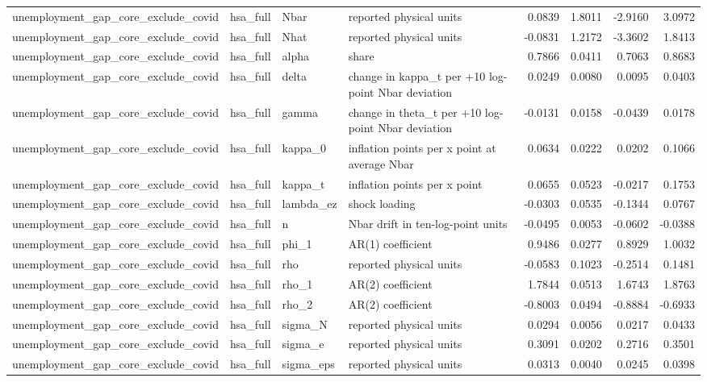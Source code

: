 \begin{tabular}{llllrrrr}
unemployment\_gap\_core\_exclude\_covid & hsa\_full & Nbar & reported physical units & 0.0839 & 1.8011 & -2.9160 & 3.0972 \\
unemployment\_gap\_core\_exclude\_covid & hsa\_full & Nhat & reported physical units & -0.0831 & 1.2172 & -3.3602 & 1.8413 \\
unemployment\_gap\_core\_exclude\_covid & hsa\_full & alpha & share & 0.7866 & 0.0411 & 0.7063 & 0.8683 \\
unemployment\_gap\_core\_exclude\_covid & hsa\_full & delta & change in kappa\_t per +10 log-point Nbar deviation & 0.0249 & 0.0080 & 0.0095 & 0.0403 \\
unemployment\_gap\_core\_exclude\_covid & hsa\_full & gamma & change in theta\_t per +10 log-point Nbar deviation & -0.0131 & 0.0158 & -0.0439 & 0.0178 \\
unemployment\_gap\_core\_exclude\_covid & hsa\_full & kappa\_0 & inflation points per x point at average Nbar & 0.0634 & 0.0222 & 0.0202 & 0.1066 \\
unemployment\_gap\_core\_exclude\_covid & hsa\_full & kappa\_t & inflation points per x point & 0.0655 & 0.0523 & -0.0217 & 0.1753 \\
unemployment\_gap\_core\_exclude\_covid & hsa\_full & lambda\_ez & shock loading & -0.0303 & 0.0535 & -0.1344 & 0.0767 \\
unemployment\_gap\_core\_exclude\_covid & hsa\_full & n & Nbar drift in ten-log-point units & -0.0495 & 0.0053 & -0.0602 & -0.0388 \\
unemployment\_gap\_core\_exclude\_covid & hsa\_full & phi\_1 & AR(1) coefficient & 0.9486 & 0.0277 & 0.8929 & 1.0032 \\
unemployment\_gap\_core\_exclude\_covid & hsa\_full & rho & reported physical units & -0.0583 & 0.1023 & -0.2514 & 0.1481 \\
unemployment\_gap\_core\_exclude\_covid & hsa\_full & rho\_1 & AR(2) coefficient & 1.7844 & 0.0513 & 1.6743 & 1.8763 \\
unemployment\_gap\_core\_exclude\_covid & hsa\_full & rho\_2 & AR(2) coefficient & -0.8003 & 0.0494 & -0.8884 & -0.6933 \\
unemployment\_gap\_core\_exclude\_covid & hsa\_full & sigma\_N & reported physical units & 0.0294 & 0.0056 & 0.0217 & 0.0433 \\
unemployment\_gap\_core\_exclude\_covid & hsa\_full & sigma\_e & reported physical units & 0.3091 & 0.0202 & 0.2716 & 0.3501 \\
unemployment\_gap\_core\_exclude\_covid & hsa\_full & sigma\_eps & reported physical units & 0.0313 & 0.0040 & 0.0245 & 0.0398 \\

\end{tabular}
